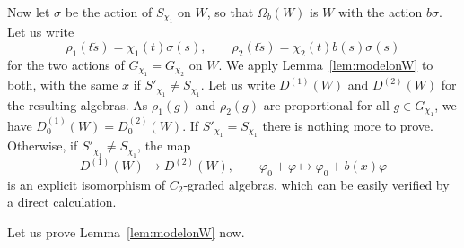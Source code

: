 \begin{just}
Now let $\sigma$ be the action of $S_{\chi_1}$ on $W$, so that $\Omega_b(W)$ is $W$ with the action $b\sigma$. Let us write
\[
\rho_1(t \breve{s}) = \chi_1(t) \sigma(s), \qquad \rho_2(t \breve{s}) = \chi_2(t) b(s) \sigma(s)
\]
for the two actions of $G_{\chi_1} = G_{\chi_2}$ on $W$. We apply Lemma~\ref{lem:modelonW} to both, with the same $x$ if $S'_{\chi_1} \neq S_{\chi_1}$. Let us write $D^{(1)}(W)$ and $D^{(2)}(W)$ for the resulting algebras. As $\rho_1(g)$ and $\rho_2(g)$ are proportional for all $g \in G_{\chi_1}$, we have $D^{(1)}_0(W) = D^{(2)}_0(W)$. If $S'_{\chi_1} = S_{\chi_1}$ there is nothing more to prove.
Otherwise, if $S'_{\chi_1} \neq  S_{\chi_1}$, the map
\[
D^{(1)}(W) \rightarrow D^{(2)}(W), \qquad \varphi_0 + \varphi \mapsto \varphi_0 + b(x) \varphi
\]
is an explicit isomorphism of $C_2$-graded algebras, which can be easily verified by a direct calculation.
\end{just}

Let us prove Lemma~\ref{lem:modelonW} now.

